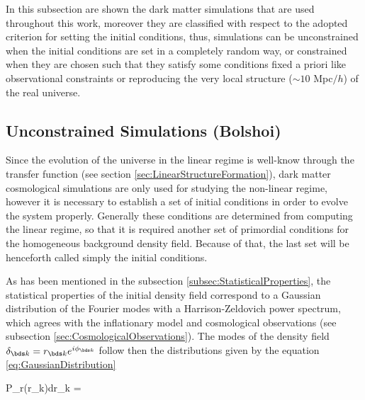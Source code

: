 In this subsection are shown the dark matter simulations that are used
throughout this work, moreover they are classified with respect to the
adopted criterion for setting the initial conditions, thus, simulations
can be unconstrained when the initial conditions are set in a completely 
random way, or constrained when they are chosen such that they satisfy 
some conditions fixed a priori like observational constraints or 
reproducing the very local structure ($\sim 10$ Mpc$/h$) of the real 
universe.


	\subsection{Unconstrained Simulations (Bolshoi)}
	\label{subsec:UnconstrainedSimulations}


Since the evolution of the universe in the linear regime is well-know 
through the transfer function (see section 
\ref{sec:LinearStructureFormation}), dark matter cosmological simulations 
are only used for studying the non-linear regime, however it is necessary 
to establish a set of initial conditions in order to evolve the system 
properly. Generally these conditions are determined from computing the 
linear regime, so that it is required another set of primordial conditions 
for the homogeneous background density field. Because of that, the last 
set will be henceforth called simply the initial conditions.


As has been mentioned in the subsection \ref{subsec:StatisticalProperties},
the statistical properties of the initial density field correspond to a
Gaussian distribution of the Fourier modes with a Harrison-Zeldovich 
power spectrum, which agrees with the inflationary model and cosmological
observations (see subsection \ref{sec:CosmologicalObservations}). The 
modes of the density field $\delta_{\bds k} = r_{\bds k}e^{i\phi_{\bds k}}$
follow then the distributions given by the equation 
\ref{eq:GaussianDistribution}



{ P_r(r_{\bds k})dr_{\bds k} = \exp{}
 }


